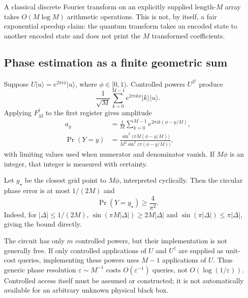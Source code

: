 \documentclass[11pt,a4paper]{article}
\newcommand{\ket}[1]{\lvert #1\rangle}
\theoremstyle{definition}
\theoremstyle{remark}
\numberwithin{equation}{section}
\begin{document}
A classical discrete Fourier transform on an explicitly supplied length-$M$
array takes $O(M\log M)$ arithmetic operations. This is not, by itself, a
fair exponential speedup claim: the quantum transform takes an encoded
state to another encoded state and does not print the $M$ transformed
coefficients.

\subsection{Phase estimation as a finite geometric sum}
Suppose $U\ket{u}=e^{2\pi i\phi}\ket{u}$, where $\phi\in[0,1)$.
Controlled powers $U^{2^j}$ produce
\begin{equation}
 \frac1{\sqrt M}\sum_{k=0}^{M-1}e^{2\pi ik\phi}\ket{k}\ket{u}.
\end{equation}
Applying $F_M^\dagger$ to the first register gives amplitude
\begin{align}
 a_y&=\frac1M\sum_{k=0}^{M-1}e^{2\pi ik(\phi-y/M)},\\
 \Pr(Y=y)&=\frac{\sin^2\!\bigl(\pi M(\phi-y/M)\bigr)}
 {M^2\sin^2\!\bigl(\pi(\phi-y/M)\bigr)},\label{eq:qpedist}
\end{align}
with limiting values used when numerator and denominator vanish.
If $M\phi$ is an integer, that integer is measured with certainty.

Let $y_\star$ be the closest grid point to $M\phi$, interpreted cyclically.
Then the circular phase error is at most $1/(2M)$ and
\begin{equation}
 \Pr(Y=y_\star)\geq \frac4{\pi^2}.
\end{equation}
Indeed, for $|\Delta|\leq1/(2M)$,
$\sin(\pi M|\Delta|)\geq2M|\Delta|$ and
$\sin(\pi|\Delta|)\leq\pi|\Delta|$, giving the bound directly.

The circuit has only $m$ controlled powers, but their implementation is
not generally free. If only controlled applications of $U$ and $U^\dagger$
are supplied as unit-cost queries, implementing these powers uses $M-1$
applications of $U$. Thus generic phase resolution $\varepsilon\sim M^{-1}$
costs $O(\varepsilon^{-1})$ queries, not $O(\log(1/\varepsilon))$.
Controlled access itself must be assumed or constructed; it is not
automatically available for an arbitrary unknown physical black box.
\end{document}
